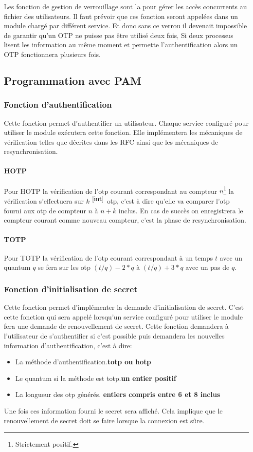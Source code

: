 Les fonction de gestion de verrouillage sont la pour gérer les accès concurrents
au fichier des utilisateurs. Il faut prévoir que ces fonction seront appelées
dans un module chargé par différent service. Et donc sans ce verrou il devenait
impossible de garantir qu'un OTP ne puisse pas être utilisé deux fois, Si deux
processus lisent les information au même moment et permette l'authentification
alors un OTP fonctionnera plusieurs fois.

\subsection{Programmation avec PAM}
\subsubsection{Fonction d'authentification}
Cette fonction permet d'authentifier un utilisateur. Chaque service configuré
pour utiliser le module exécutera cette fonction. Elle implémentera les
mécaniques de vérification telles que décrites dans les RFC ainsi que les
mécaniques de resynchronisation.
\paragraph{HOTP}
Pour HOTP la vérification de l'otp courant correspondant au compteur
$n$\footnote{Strictement positif.\label{int}} la vérification s'effectuera sur
$k$ $^{\ref{int}}$ otp, c'est à dire qu'elle va comparer l'otp fourni aux otp de
compteur $n$ à $n+k$ inclus. En cas de succès on enregistrera le compteur
courant comme nouveau compteur, c'est la phase de resynchronisation.
\paragraph{TOTP}
Pour TOTP la vérification de l'otp courant correspondant à un temps $t$ avec un
quantum $q$ se fera sur les otp $(t / q) - 2 * q$ à $(t / q) + 3 *q$ avec un
pas de $q$.
\subsubsection{Fonction d'initialisation de secret}
Cette fonction permet d'implémenter la demande d'initialisation de secret.
C'est cette fonction qui sera appelé lorsqu'un service configuré pour utiliser
le module fera une demande de renouvellement de secret. Cette fonction demandera
à l'utilisateur de s'authentifier si c'est possible puis demandera les nouvelles
information d'authentification, c'est à dire:
\begin{itemize}
  \item La méthode d'authentification.\hfill\textbf{totp ou hotp}
  \item Le quantum si la méthode est totp.\hfill \textbf{un entier positif}
  \item La longueur des otp générés.
  \hfill\textbf{entiers compris entre 6 et 8 inclus}
\end{itemize}
Une fois ces information fourni le secret sera affiché. Cela implique que le
renouvellement de secret doit se faire lorsque la connexion est sûre.


